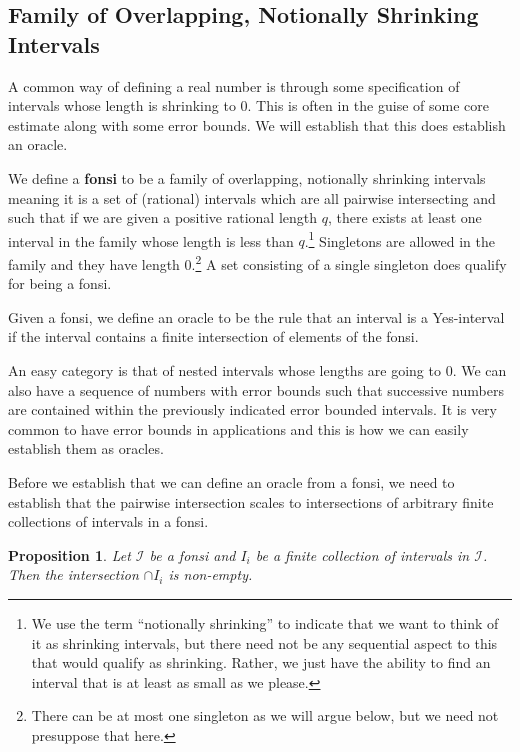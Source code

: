 \documentclass[12pt]{article}
\newtheorem{proposition}{Proposition}
\theoremstyle{remark}
\begin{document}
\subsection{Family of Overlapping, Notionally Shrinking Intervals} \label{sec:ni}

A common way of defining a real number is through some specification of intervals whose length is shrinking to 0. This is often in the guise of some core estimate along with some error bounds. We will establish that this does establish an oracle. 

We define a \textbf{fonsi} to be a family of overlapping, notionally shrinking intervals meaning it is a set of (rational) intervals which are all pairwise intersecting and such that if we are given a positive rational length $q$, there exists at least one interval in the family whose length is less than $q$.\footnote{We use the term ``notionally shrinking'' to indicate that we want to think of it as shrinking intervals, but there need not be any sequential aspect to this that would qualify as shrinking. Rather, we just have the ability to find an interval that is at least as small as we please.} Singletons are allowed in the family and they have length 0.\footnote{There can be at most one singleton as we will argue below, but we need not presuppose that here.} A set consisting of a single singleton does qualify for being a fonsi.

Given a fonsi, we define an oracle to be the rule that an interval is a Yes-interval if the interval contains a finite intersection of elements of the fonsi. 

An easy category is that of nested intervals whose lengths are going to 0. We can also have a sequence of numbers with error bounds such that successive numbers are contained within the previously indicated error bounded intervals.  It is very common to have error bounds in applications and this is how we can easily establish them as oracles. 

Before we establish that we can define an oracle from a fonsi, we need to establish that the pairwise intersection scales to intersections of arbitrary finite collections of  intervals in a fonsi. 

\begin{proposition}
 Let $\mathcal{I}$ be a fonsi and $I_i$ be a finite collection of intervals in $\mathcal{I}$. Then the intersection $\cap I_i$ is non-empty.
\end{proposition}
\end{document}
